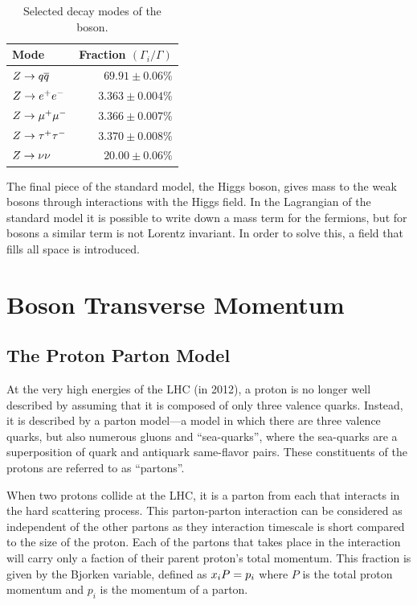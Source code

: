 \begin{table}[h]
\centering
{}
\begin{center}
    \begin{tabular}{@{}l  r@{}}
        \toprule
        Mode & Fraction $\left( \Gamma_{i} / \Gamma \right)$ \\
        \midrule
        $Z \to q \overline{q}$ & $69.91 \pm 0.06\%$ \\
        $Z \to e^{+} e^{-}$ & $3.363 \pm 0.004\%$ \\
        $Z \to \mu^{+} \mu^{-}$ & $3.366 \pm 0.007\%$ \\
        $Z \to \tau^{+} \tau^{-}$ & $3.370 \pm 0.008\%$ \\
        $Z \to \nu \nu$ & $20.00 \pm 0.06\%$ \\
        \bottomrule
    \end{tabular}
    \caption{
        Selected decay modes of the \Z boson.
    }
\label{table:z_decays}
\end{center}
\end{table}

The final piece of the standard model, the Higgs boson, gives mass to the weak
bosons through interactions with the Higgs field. In the Lagrangian of the
standard model it is possible to write down a mass term for the \spinhalf
fermions, but for \spinone bosons a similar term is not Lorentz invariant. In
order to solve this, a \spinzero field that fills all space is introduced.

\section{\texorpdfstring{\Z}{Z} Boson Transverse Momentum}

\subsection{The Proton Parton Model}
\label{ssec:parton_model}

At the very high energies of the LHC (\rootseight in 2012), a proton is no
longer well described by assuming that it is composed of only three valence
quarks. Instead, it is described by a parton model---a model in which there are
three valence quarks, but also numerous gluons and ``sea-quarks'', where the
sea-quarks are a superposition of quark and antiquark same-flavor pairs. These
constituents of the protons are referred to as ``partons''.

When two protons collide at the LHC, it is a parton from each that interacts in
the hard scattering process. This parton-parton interaction can be considered
as independent of the other partons as they interaction timescale is short
compared to the size of the proton. Each of the partons that takes place in the
interaction will carry only a faction of their parent proton's total momentum.
This fraction is given by the Bjorken  variable, defined as
$x_{i} P = p_{i}$ where $P$ is the total proton momentum and $p_{i}$ is the
momentum of a parton.

